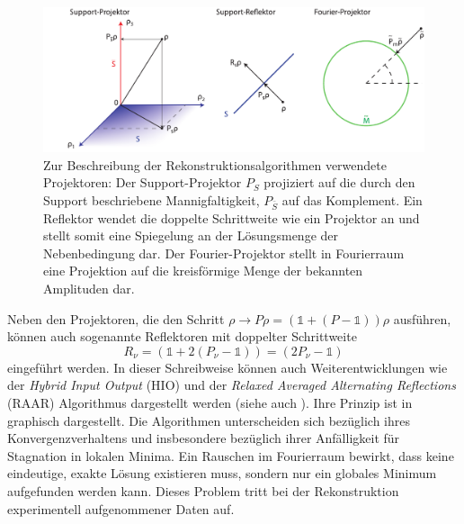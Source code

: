 \begin{figure}
	\centering
	\includegraphics[width=1\textwidth]{images/projektor.pdf}
	\caption[Projektoren zur Beschreibung der Rekonstruktionsalgorithmen]{Zur Beschreibung der Rekonstruktionsalgorithmen verwendete Projektoren: Der Support-Projektor $P_S$ projiziert auf die durch den Support beschriebene Mannigfaltigkeit, $P_{\bar{S}}$ auf das Komplement. Ein Reflektor wendet die doppelte Schrittweite wie ein Projektor an und stellt somit eine Spiegelung an der Lösungsmenge der Nebenbedingung dar. Der Fourier-Projektor stellt in Fourierraum eine Projektion auf die kreisförmige Menge der bekannten Amplituden dar.}
	\label{fig:projektoren}
\end{figure}
Neben den Projektoren, die den Schritt $\rho \rightarrow P\rho = (\mathbb{1}+(P-\mathbb{1}))\rho$ ausführen, können auch sogenannte Reflektoren mit doppelter Schrittweite
\begin{equation}
	R_\nu= (\mathbb{1}+2(P_\nu-\mathbb{1}))=(2P_\nu-\mathbb{1})
\end{equation}
eingeführt werden.
In dieser Schreibweise können auch Weiterentwicklungen wie der \textit{Hybrid Input Output} (HIO) und  der\textit{ Relaxed Averaged Alternating Reflections} (RAAR) Algorithmus dargestellt werden (siehe auch ). Ihre Prinzip ist in  graphisch dargestellt. Die Algorithmen unterscheiden sich bezüglich ihres Konvergenzverhaltens und insbesondere bezüglich ihrer Anfälligkeit für Stagnation in lokalen Minima. 
Ein Rauschen im Fourierraum bewirkt, dass keine eindeutige, exakte Lösung existieren muss, sondern nur ein globales Minimum aufgefunden werden kann. Dieses Problem tritt bei der Rekonstruktion experimentell aufgenommener Daten auf.
